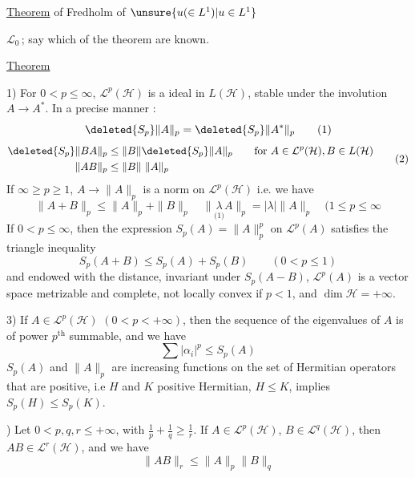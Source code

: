 \uline{Theorem}  of Fredholm of $\unsure{u(\in L^1)|u\in L^1}$ 

 $\mathcal L_0$\,; say   which
 of the  theorem \unsure{--} are known.

\uline{Theorem}

1) For  $0<p\leq\infty$, $\mathcal L^p(\mathcal H)$ is a  ideal
in $L(\mathcal H)$, stable under the involution $A\to A^*$. In a
 precise manner :
\[
\deleted{S_p}\|A\|_p=\deleted{S_p}\|A^*\|_p \tag*{(1)}
\]
\[
\begin{aligned}
\deleted{S_p}\|BA\|_p&\leq\|B\|\deleted{S_p}\|A\|_p
\qquad\text{for } A\in\mathcal L^p(\mathcal H),B\in L(\mathcal H)\\
\|AB\|_p&\leq\|B\|\ \|A\|_p
\end{aligned}\tag*{(2)}
\]
If $\infty\geq p\geq1$, $A\to\|A\|_p$ is a norm on $\mathcal L^p(\mathcal H)$ 
i.e. we have
\[
\|A+B\|_p\leq\|A\|_p+\|B\|_p\quad\|\underset{\text{(1)}}{\lambda} A\|_p=|\lambda|\|A\|_p
\quad(1\leq p\leq\infty\tag*{(3)}
\]
If $0<p\leq\infty$, then the expression $S_p(A)=\|A\|_p^p$ on
$\mathcal L^p(A)$ satisfies the triangle inequality
\[
S_p(A+B)\leq S_p(A)+S_p(B)\qquad(0<p\leq1)\tag*{(4)}
\]
and endowed with the distance, invariant under 
$S_p(A-B)$, $\mathcal L^p(A)$ is a  vector space
metrizable and complete, not locally convex
if $p<1$, and $\dim\mathcal H=+\infty$.

3) If $A\in\mathcal L^p(\mathcal H)$ $(0<p<+\infty)$, then the sequence
of the eigenvalues  of $A$ is of power
$p^{\mathrm{th}}$ summable, and we have
\[
\sum|\alpha_i|^p\leq S_p(A)\tag*{(5)}
\]
$S_p(A)$ and $\|A\|_p$ are increasing functions
on the set of Hermitian operators
that are positive, i.e $H$ and $K$ positive Hermitian, $H\leq K$,
implies $S_p(H)\leq S_p(K)$.

) Let $0<p,q,r\leq+\infty$, with $\frac{1}{p}+\frac{1}{q}\geq\frac{1}{r}$. If 
$A\in\mathcal L^p(\mathcal H)$, $B\in\mathcal L^q(\mathcal H)$, then $AB\in\mathcal L^r(\mathcal H)$, and we have
\[
\|AB\|_r\leq\|A\|_p\|B\|_q\tag*{(6)}
\]
